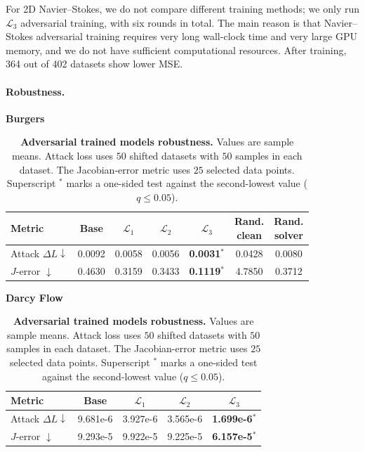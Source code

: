 \documentclass[letterpaper]{article} %
\begin{document}
For 2D Navier--Stokes, we do not compare different training methods; we only
run \(\mathcal L_3\) adversarial training, with six rounds in total. The main
reason is that Navier--Stokes adversarial training requires very long
wall-clock time and very large GPU memory, and we do not have sufficient
computational resources. After training, 364 out of 402 datasets show lower
MSE.

\paragraph{Robustness.}
\begin{table}[t]
\centering
\normalsize
\captionsetup{skip=1pt}
\setlength{\tabcolsep}{5pt}
\renewcommand{\arraystretch}{0.96}
\caption{\textbf{Adversarial trained models robustness.} Values are sample means.
Attack loss uses \(50\) shifted datasets with \(50\)
samples in each dataset.  The Jacobian-error metric uses \(25\) selected
data points.  Superscript \(^{*}\) marks a one-sided test against the
second-lowest value (\(q\le 0.05\)).}
\label{tab:adversarial_training_robustness_summary}
\textbf{Burgers}\\[0.2em]
\setlength{\tabcolsep}{1.4pt}
\begin{tabular}{@{}lcccccc@{}}
\toprule
Metric & Base & \(\mathcal L_1\) & \(\mathcal L_2\) &
\(\mathcal L_3\) & \shortstack{Rand.\\clean} & \shortstack{Rand.\\solver} \\
\midrule
Attack \(\Delta L\downarrow\) &
0.0092 & 0.0058 & 0.0056 & \textbf{0.0031}\(^{*}\) & 0.0428 & 0.0080 \\
\(J\)-error \(\downarrow\) &
0.4630 & 0.3159 & 0.3433 & \textbf{0.1119}\(^{*}\) & 4.7850 & 0.3712 \\
\bottomrule
\end{tabular}

\vspace{0.05em}
\textbf{Darcy Flow}\\[0.2em]
\setlength{\tabcolsep}{3pt}
\begin{tabular}{@{}lcccc@{}}
\toprule
Metric & Base & \(\mathcal L_1\) & \(\mathcal L_2\) &
\(\mathcal L_3\) \\
\midrule
Attack \(\Delta L\downarrow\) &
9.681e-6 & 3.927e-6 & 3.565e-6 & \textbf{1.699e-6}\(^{*}\) \\
\(J\)-error \(\downarrow\) &
9.293e-5 & 9.922e-5 & 9.225e-5 & \textbf{6.157e-5}\(^{*}\) \\
\bottomrule
\end{tabular}


\end{table}
\end{document}
